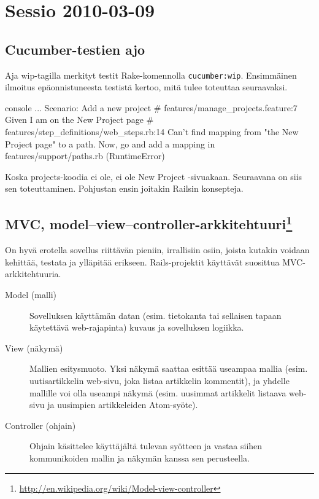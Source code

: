 \documentclass{article}
\begin{document}
\section{Sessio 2010-03-09}

\subsection{Cucumber-testien ajo}

\begin{samepage}
Aja wip-tagilla merkityt testit Rake-komennolla \texttt{cucumber:wip}.
Ensimmäinen ilmoitus epäonnistuneesta testistä kertoo, mitä tulee toteuttaa
seuraavaksi.

\begin{pygmented}{console}
...
  Scenario: Add a new project                           # features/manage_projects.feature:7
    Given I am on the New Project page                  # features/step_definitions/web_steps.rb:14
      Can't find mapping from "the New Project page" to a path.
      Now, go and add a mapping in features/support/paths.rb (RuntimeError)
\end{pygmented}
\end{samepage}

Koska projects-koodia ei ole, ei ole New Project -sivuakaan. Seuraavana on siis
sen toteuttaminen. Pohjustan ensin joitakin Railsin konsepteja.

\subsection[MVC, model--view--controller-arkkitehtuuri]{MVC,
model--view--controller-arkkitehtuuri\footnote{\url{http://en.wikipedia.org/wiki/Model-view-controller}}}

On hyvä erotella sovellus riittävän pieniin, irrallisiin osiin, joista kutakin
voidaan kehittää, testata ja ylläpitää erikseen. Rails-projektit käyttävät
suosittua MVC-arkkitehtuuria.

\begin{description}
\item[Model (malli)]
Sovelluksen käyttämän datan (esim. tietokanta tai sellaisen tapaan käytettävä
web-rajapinta) kuvaus ja sovelluksen logiikka.

\item[View (näkymä)]
Mallien esitysmuoto. Yksi näkymä saattaa esittää useampaa mallia (esim.
uutisartikkelin web-sivu, joka listaa artikkelin kommentit), ja yhdelle
mallille voi olla useampi näkymä (esim. uusimmat artikkelit listaava web-sivu
ja uusimpien artikkeleiden Atom-syöte).

\item[Controller (ohjain)]
Ohjain käsittelee käyttäjältä tulevan syötteen ja vastaa siihen kommunikoiden
mallin ja näkymän kanssa sen perusteella.
\end{description}
\end{document}
